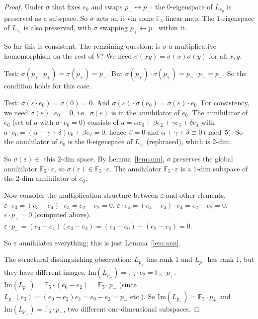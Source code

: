 \documentclass[11pt,reqno]{amsart}
\theoremstyle{plain}
\theoremstyle{definition}
\theoremstyle{remark}
\newcommand{\F}{\mathbb{F}}
\begin{document}
\begin{proof}
Under $\sigma$ that fixes $e_0$ and swaps $p_+ \leftrightarrow p_-$: the $0$-eigenspace of $L_{e_0}$ is preserved as a subspace. So $\sigma$ acts on it via some $\F_5$-linear map. The $1$-eigenspace of $L_{e_0}$ is also preserved, with $\sigma$ swapping $p_+ \leftrightarrow p_-$ within it.

So far this is consistent. The remaining question: is $\sigma$ a multiplicative homomorphism on the rest of $V$? We need $\sigma(x y) = \sigma(x) \sigma(y)$ for all $x, y$.

Test: $\sigma(p_+ \cdot p_+) = \sigma(p_+) = p_-$. But $\sigma(p_+) \cdot \sigma(p_+) = p_- \cdot p_- = p_-$. So the condition holds for this case.

Test: $\sigma(\varepsilon \cdot e_0) = \sigma(0) = 0$. And $\sigma(\varepsilon) \cdot \sigma(e_0) = \sigma(\varepsilon) \cdot e_0$. For consistency, we need $\sigma(\varepsilon) \cdot e_0 = 0$, i.e.\ $\sigma(\varepsilon)$ is in the annihilator of $e_0$. The annihilator of $e_0$ (set of $a$ with $a \cdot e_0 = 0$) consists of $a = \alpha e_0 + \beta e_2 + \gamma e_3 + \delta e_4$ with $a \cdot e_0 = (\alpha + \gamma + \delta) e_0 + \beta e_2 = 0$, hence $\beta = 0$ and $\alpha + \gamma + \delta \equiv 0 \pmod 5$. So the annihilator of $e_0$ is the $0$-eigenspace of $L_{e_0}$ (rephrased), which is $2$-dim.

So $\sigma(\varepsilon) \in $ this 2-dim space. By Lemma~\ref{lem:ann}, $\sigma$ preserves the global annihilator $\F_5 \cdot \varepsilon$, so $\sigma(\varepsilon) \in \F_5 \cdot \varepsilon$. The annihilator $\F_5 \cdot \varepsilon$ is a $1$-dim subspace of the $2$-dim annihilator of $e_0$.

Now consider the multiplication structure between $\varepsilon$ and other elements. $\varepsilon \cdot e_3 = (e_3 - e_4) \cdot e_3 = e_2 - e_2 = 0$. $\varepsilon \cdot e_4 = (e_3 - e_4) \cdot e_4 = e_2 - e_2 = 0$. $\varepsilon \cdot p_+ = 0$ (computed above). $\varepsilon \cdot p_- = (e_3 - e_4)(e_0 - e_2) = (e_0 - e_0) - (e_2 - e_2) = 0$.

So $\varepsilon$ annihilates everything; this is just Lemma~\ref{lem:ann}.

The structural distinguishing observation: $L_{p_+}$ has rank $1$ and $L_{p_-}$ has rank $1$, but they have different images. $\mathrm{Im}(L_{p_+}) = \F_5 \cdot e_2 = \F_5 \cdot p_+$. $\mathrm{Im}(L_{p_-}) = \F_5 \cdot (e_0 - e_2) = \F_5 \cdot p_-$ (since $L_{p_-}(e_3) = (e_0 - e_2) e_3 = e_0 - e_2 = p_-$ etc.). So $\mathrm{Im}(L_{p_+}) = \F_5 \cdot p_+$ and $\mathrm{Im}(L_{p_-}) = \F_5 \cdot p_-$, two different one-dimensional subspaces.


\end{proof}
\end{document}
